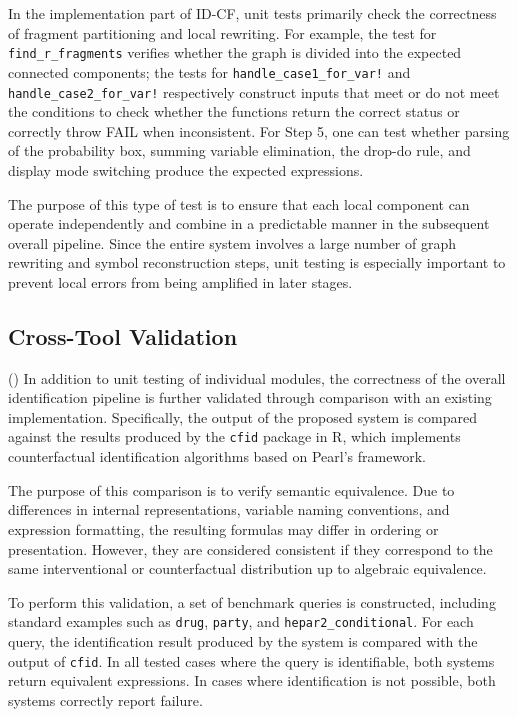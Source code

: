 \documentclass[a4paper]{report}
\begin{document}
In the implementation part of ID-CF, unit tests primarily check the correctness of fragment partitioning and local rewriting. For example, the test for \texttt{find\_r\_fragments} verifies whether the graph is divided into the expected connected components; the tests for \texttt{handle\_case1\_for\_var!} and \texttt{handle\_case2\_for\_var!} respectively construct inputs that meet or do not meet the conditions to check whether the functions return the correct status or correctly throw FAIL when inconsistent. For Step 5, one can test whether parsing of the probability box, summing variable elimination, the drop-do rule, and display mode switching produce the expected expressions.

The purpose of this type of test is to ensure that each local component can operate independently and combine in a predictable manner in the subsequent overall pipeline. Since the entire system involves a large number of graph rewriting and symbol reconstruction steps, unit testing is especially important to prevent local errors from being amplified in later stages.

\subsection{Cross-Tool Validation}
(\cite{cfid_package})
In addition to unit testing of individual modules, the correctness of the overall identification pipeline is further validated through comparison with an existing implementation. Specifically, the output of the proposed system is compared against the results produced by the \texttt{cfid} package in R, which implements counterfactual identification algorithms based on Pearl’s framework.

The purpose of this comparison is to verify semantic equivalence. Due to differences in internal representations, variable naming conventions, and expression formatting, the resulting formulas may differ in ordering or presentation. However, they are considered consistent if they correspond to the same interventional or counterfactual distribution up to algebraic equivalence.

To perform this validation, a set of benchmark queries is constructed, including standard examples such as \texttt{drug}, \texttt{party}, and \texttt{hepar2\_conditional}. For each query, the identification result produced by the system is compared with the output of \texttt{cfid}. In all tested cases where the query is identifiable, both systems return equivalent expressions. In cases where identification is not possible, both systems correctly report failure.
\end{document}
